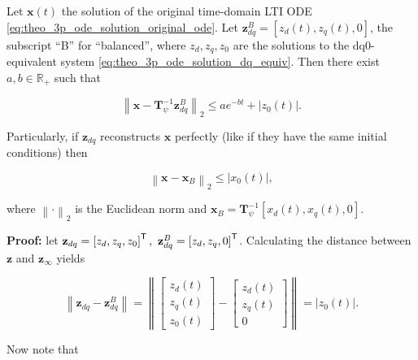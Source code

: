 \begin{corollary} \label{corollary:bounds_solution_3p_ode}%

	Let $\mathbf{x}(t)$ the solution of the original time-domain LTI ODE \eqref{eq:theo_3p_ode_solution_original_ode}. Let $\mathbf{z}_{dq}^B = \left[z_d(t),z_q(t),0\right]$, the subscript ``B'' for ``balanced'', where $z_d,z_q,z_0$ are the solutions to the dq0-equivalent system \eqref{eq:theo_3p_ode_solution_dq_equiv}. Then there exist $a,b\in\mathbb{R}_+$ such that

\begin{equation} \left\lVert \mathbf{x} - \mathbf{T}^{-1}_\psi\mathbf{z}_{dq}^B \right\rVert_2 \leq ae^{-bt} + \left\lvert z_0(t) \right\rvert .\end{equation}

	Particularly, if $\mathbf{z}_{dq}$ reconstructs $\mathbf{x}$ perfectly (like if they have the same initial conditions) then

\begin{equation} \left\lVert \mathbf{x} - \mathbf{x}_B \right\rVert_2 \leq \left\lvert x_0(t)\right\rvert ,\end{equation}

	\noindent where $\left\lVert\cdot\right\rVert_2$ is the Euclidean norm  and $\mathbf{x}_B = \mathbf{T}^{-1}_\psi\left[x_d(t),x_q(t),0\right]$.
\end{corollary}
\textbf{Proof:} let $\mathbf{z}_{dq} = \left[z_d,z_q,z_0\right]^{\mathsf{T}},\ \mathbf{z}_{dq}^B = \left[z_d, z_q,0\right]^{\mathsf{T}}$. Calculating the distance between $\mathbf{z}$ and $\mathbf{z}_\infty$ yields

\begin{equation} \left\lVert \mathbf{z}_{dq} - \mathbf{z}_{dq}^B \right\rVert =  \left\lVert \left[\begin{array}{c} z_d(t) \\[3mm] z_q(t) \\[3mm] z_0(t) \end{array}\right] - \left[\begin{array}{c} z_d(t) \\[3mm] z_q(t) \\[3mm] 0 \end{array}\right]\right\rVert = \left\lvert z_0(t)\right\rvert . \label{eq:balanced_3p_ode_solution_eq2}\end{equation}

	Now note that

